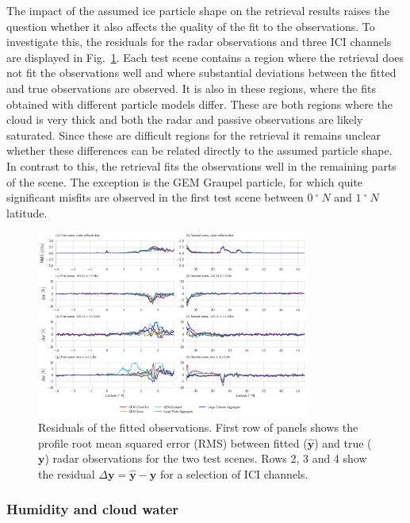 \documentclass[journal abbreviation, manuscript]{copernicus}
\begin{document}
The impact of the assumed ice particle shape on the retrieval results raises the
question whether it also affects the quality of the fit to the observations. To
investigate this, the residuals for the radar observations and three ICI
channels are displayed in Fig.~\ref{fig:misfit}. Each test scene contains a
region where the retrieval does not fit the observations well and where
substantial deviations between the fitted and true observations are observed. It
is also in these regions, where the fits obtained with different particle models
differ. These are both regions where the cloud is very thick and both the radar
and passive observations are likely saturated. Since these are difficult regions
for the retrieval it remains unclear whether these differences can be related
directly to the assumed particle shape. In contrast to this, the retrieval fits
the observations well in the remaining parts of the scene. The exception is the
GEM Graupel particle, for which quite significant misfits are observed in the
first test scene between $0\ \unit{^{\circ}\ N}$ and $1\ \unit{^{\circ}\ N}$
latitude.

\begin{figure}[!h]
\centering
\includegraphics[width = 0.8\textwidth]{../plots/misfits}
\caption{Residuals of the fitted observations. First row of panels shows the
  profile root mean squared error (RMS) between fitted ($\hat{\mathbf{y}}$) and
  true ($\mathbf{y}$) radar observations for the two test scenes. Rows 2, 3 and
  4 show the residual $\Delta \mathbf{y} = \hat{\mathbf{y}} - \mathbf{y}$ for a
  selection of ICI channels.}
\label{fig:misfit}
\end{figure}

\subsubsection{Humidity and cloud water}
\end{document}
